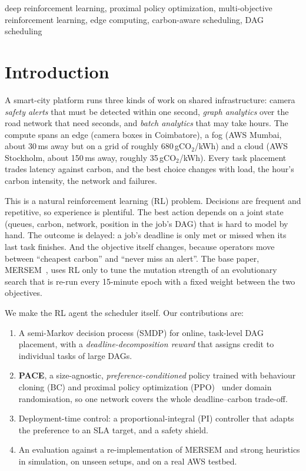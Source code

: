 \documentclass[conference]{IEEEtran}
\newcommand{\gco}{gCO$_2$}
\begin{document}
\begin{IEEEkeywords}
deep reinforcement learning, proximal policy optimization, multi-objective reinforcement learning, edge computing, carbon-aware scheduling, DAG scheduling
\end{IEEEkeywords}

\section{Introduction}
A smart-city platform runs three kinds of work on shared infrastructure: camera \emph{safety alerts} that must be detected within one second, \emph{graph analytics} over the road network that need seconds, and \emph{batch analytics} that may take hours. The compute spans an edge (camera boxes in Coimbatore), a fog (AWS Mumbai, about 30\,ms away but on a grid of roughly 680\,\gco/kWh) and a cloud (AWS Stockholm, about 150\,ms away, roughly 35\,\gco/kWh). Every task placement trades latency against carbon, and the best choice changes with load, the hour's carbon intensity, the network and failures.

This is a natural reinforcement learning (RL) problem. Decisions are frequent and repetitive, so experience is plentiful. The best action depends on a joint state (queues, carbon, network, position in the job's DAG) that is hard to model by hand. The outcome is delayed: a job's deadline is only met or missed when its last task finishes. And the objective itself changes, because operators move between ``cheapest carbon'' and ``never miss an alert''. The base paper, MERSEM~\cite{mersem}, uses RL only to tune the mutation strength of an evolutionary search that is re-run every 15-minute epoch with a fixed weight between the two objectives.

We make the RL agent the scheduler itself. Our contributions are:
\begin{enumerate}
\item A semi-Markov decision process (SMDP) for online, task-level DAG placement, with a \emph{deadline-decomposition reward} that assigns credit to individual tasks of large DAGs.
\item \textbf{PACE}, a size-agnostic, \emph{preference-conditioned} policy trained with behaviour cloning (BC) and proximal policy optimization (PPO)~\cite{ppo} under domain randomisation, so one network covers the whole deadline--carbon trade-off.
\item Deployment-time control: a proportional-integral (PI) controller that adapts the preference to an SLA target, and a safety shield.
\item An evaluation against a re-implementation of MERSEM and strong heuristics in simulation, on unseen setups, and on a real AWS testbed.
\end{enumerate}
\end{document}
